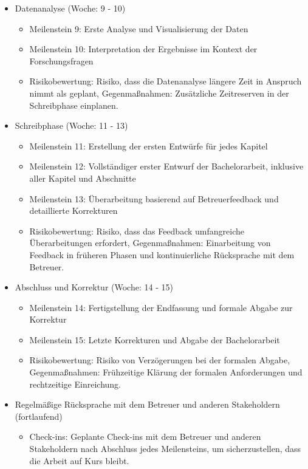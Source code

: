 \begin{itemize}
\item Datenanalyse (Woche: 9 - 10) \cite{ChatGPT2024}
\begin{itemize}
    \item Meilenstein 9: Erste Analyse und Visualisierung der Daten \cite{ChatGPT2024}
    \item Meilenstein 10: Interpretation der Ergebnisse im Kontext der Forschungsfragen \cite{ChatGPT2024}
    \item Risikobewertung: Risiko, dass die Datenanalyse längere Zeit in Anspruch nimmt als geplant, Gegenmaßnahmen: Zusätzliche Zeitreserven in der Schreibphase einplanen. \cite{ChatGPT2024}
\end{itemize}

\item Schreibphase (Woche: 11 - 13) \cite{ChatGPT2024}
\begin{itemize}
  \item Meilenstein 11: Erstellung der ersten Entwürfe für jedes Kapitel \cite{ChatGPT2024}
    \item Meilenstein 12: Vollständiger erster Entwurf der Bachelorarbeit, inklusive aller Kapitel und Abschnitte \cite{ChatGPT2024}
    \item Meilenstein 13: Überarbeitung basierend auf Betreuerfeedback und detaillierte Korrekturen \cite{ChatGPT2024}
    \item Risikobewertung: Risiko, dass das Feedback umfangreiche Überarbeitungen erfordert, Gegenmaßnahmen: Einarbeitung von Feedback in früheren Phasen und kontinuierliche Rücksprache mit dem Betreuer. \cite{ChatGPT2024}
\end{itemize}

\item Abschluss und Korrektur (Woche: 14 - 15) \cite{ChatGPT2024}
\begin{itemize}
    \item Meilenstein 14: Fertigstellung der Endfassung und formale Abgabe zur Korrektur \cite{ChatGPT2024}
    \item Meilenstein 15: Letzte Korrekturen und Abgabe der Bachelorarbeit \cite{ChatGPT2024}
    \item Risikobewertung: Risiko von Verzögerungen bei der formalen Abgabe, Gegenmaßnahmen: Frühzeitige Klärung der formalen Anforderungen und rechtzeitige Einreichung. \cite{ChatGPT2024}
\end{itemize}

\item Regelmäßige Rücksprache mit dem Betreuer und anderen Stakeholdern (fortlaufend) \cite{ChatGPT2024}
\begin{itemize}
    \item Check-ins: Geplante Check-ins mit dem Betreuer und anderen Stakeholdern nach Abschluss jedes Meilensteins, um sicherzustellen, dass die Arbeit auf Kurs bleibt. \cite{ChatGPT2024}
\end{itemize}

\end{itemize}

